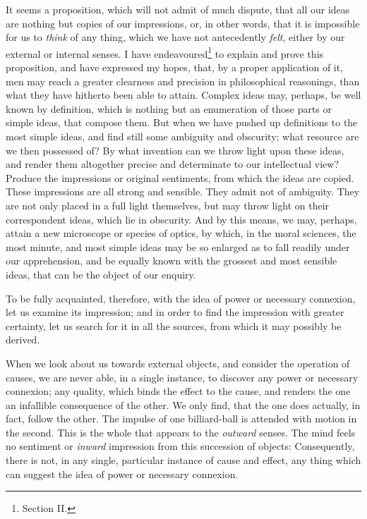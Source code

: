 \documentclass[]{article}
\newcounter{authornote}[page]
\newcommand*{\authornote}[1]{\renewcommand{\thefootnote}{\fnsymbol{footnote}}\stepcounter{authornote}\footnote[\value{authornote}]{#1}\renewcommand{\thefootnote}{\arabic{footnote}}}
\begin{document}
\begin{sectionbody}
\humeparagraph  It seems a proposition, which will not admit of much dispute, that all our ideas are nothing but copies of our impressions, or, in other words, that it is impossible for us to \emph{think} of any thing, which we have not antecedently \emph{felt}, either by our external or internal senses. I have endeavoured\authornote{Section II.} to explain and prove this proposition, and have expressed my hopes, that, by a proper application of it, men may reach a greater clearness and precision in philosophical reasonings, than what they have hitherto been able to attain. Complex ideas may, perhaps, be well known by definition, which is nothing but an enumeration of those parts or simple ideas, that compose them. But when we have pushed up definitions to the most simple ideas, and find still some ambiguity and obscurity; what resource are we then possessed of? By what invention can we throw light upon these ideas, and render them altogether precise and determinate to our intellectual view? Produce the impressions or original sentiments, from which the ideas are copied. These impressions are all strong and sensible. They admit not of ambiguity. They are not only placed in a full light themselves, but may throw light on their correspondent ideas, which lie in obscurity. And by this means, we may, perhaps, attain a new microscope or species of optics, by which, in the moral sciences, the most minute, and most simple ideas may be so enlarged as to fall readily under our apprehension, and be equally known with the grossest and most sensible ideas, that can be the object of our enquiry.

\humeparagraph  To be fully acquainted, therefore, with the idea of power or necessary connexion, let us examine its impression; and in order to find the impression with greater certainty, let us search for it in all the sources, from which it may possibly be derived.

\humeparagraph  When we look about us towards external objects, and consider the operation of causes, we are never able, in a single instance, to discover any power or necessary connexion; any quality, which binds the effect to the cause, and renders the one an infallible consequence of the other. We only find, that the one does actually, in fact, follow the other. The impulse of one billiard-ball is attended with motion in the second. This is the whole that appears to the \emph{outward} senses. The mind feels no sentiment or \emph{inward} impression from this succession of objects: Consequently, there is not, in any single, particular instance of cause and effect, any thing which can suggest the idea of power or necessary connexion.


\end{sectionbody}
\end{document}
